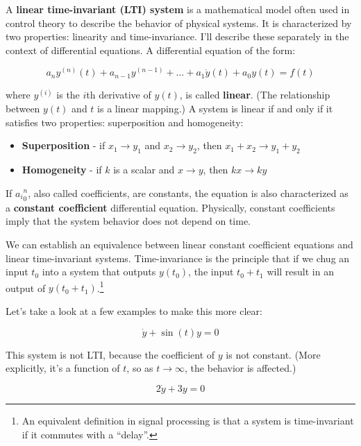 \documentclass{report}
\begin{document}
\begin{onehalfspacing}
\begin{flushleft}
A \textbf{linear time-invariant (LTI) system} is a mathematical model often used in control theory to describe the behavior of physical systems. It is characterized by two properties: linearity and time-invariance. I'll describe these separately in the context of differential equations. A differential equation of the form:

\vspace{-0.1in}
\[a_n y^{(n)} (t) + a_{n-1} y^{(n-1)} + \dots + a_1 \dot{y}(t) + a_0 y(t) = f(t)\]

where \(y^{(i)}\) is the \(i\)th derivative of \(y(t)\), is called \textbf{linear}. (The relationship between \(y(t)\) and \(t\) is a linear mapping.) A system is linear if and only if it satisfies two properties: superposition and homogeneity:

\begin{itemize}[noitemsep]
    \item \textbf{Superposition} - if \(x_1 \to y_1\) and \(x_2 \to y_2\), then \(x_1 + x_2 \to y_1 + y_2\)
    \item \textbf{Homogeneity} - if \(k\) is a scalar and \(x \to y\), then \(kx \to ky\)
\end{itemize}

If \({a_i}_0^n\), also called coefficients, are constants, the equation is also characterized as a \textbf{constant coefficient} differential equation. Physically, constant coefficients imply that the system behavior does not depend on time. 

\medskip

We can establish an equivalence between linear constant coefficient equations and linear time-invariant systems. Time-invariance is the principle that if we chug an input \(t_0\) into a system that outputs \(y(t_0)\), the input \(t_0 + t_1\) will result in an output of \(y(t_0 + t_1)\).\footnote{An equivalent definition in signal processing is that a system is time-invariant if it commutes with a ``delay''.}

\medskip

Let's take a look at a few examples to make this more clear:

\vspace{-0.1in}
\[\dot{y} + \sin(t) y = 0\]

This system is not LTI, because the coefficient of \(y\) is not constant. (More explicitly, it's a function of \(t\), so as \(t \to \infty\), the behavior is affected.)

\vspace{-0.1in}
\[2 \dot{y} + 3 y = 0\]


\end{flushleft}
\end{onehalfspacing}
\end{document}
